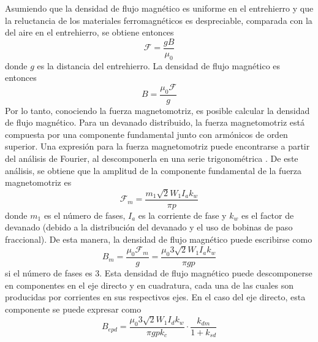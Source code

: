 Asumiendo que la densidad de flujo magnético es uniforme en el entrehierro y que la reluctancia de los materiales ferromagnéticos es despreciable, comparada con la del aire en el entrehierro, se obtiene entonces
\begin{equation*}
\mathscr{F} = \frac{gB}{\mu_0}
\end{equation*}
donde $g$ es la distancia del entrehierro. La densidad de flujo magnético es entonces
\begin{equation}
B = \frac{\mu_0\mathscr{F}}{g}
\end{equation}
Por lo tanto, conociendo la fuerza magnetomotriz, es posible calcular la densidad de flujo magnético. Para un devanado distribuido, la fuerza magnetomotriz está compuesta por una componente fundamental junto con armónicos de orden superior. Una expresión para la fuerza magnetomotriz puede encontrarse a partir del análisis de Fourier, al descomponerla en una serie trigonométrica \cite{boldea2010}. De este análisis, se obtiene que la amplitud de la componente fundamental de la fuerza magnetomotriz es
\begin{equation}
\mathscr{F}_m = \frac{m_1\sqrt{2}W_1 I_a k_w}{\pi p}
\end{equation}
donde $m_1$ es el número de fases, $I_a$ es la corriente de fase y $k_w$ es el factor de devanado (debido a la distribución del devanado y el uso de bobinas de paso fraccional). De esta manera, la densidad de flujo magnético puede escribirse como
\begin{equation}
B_m = \frac{\mu_0 \mathscr{F}_m}{g}
= \frac{\mu_0 3\sqrt{2}W_1 I_a k_w}{\pi g p}
\end{equation}
si el número de fases es 3. Esta densidad de flujo magnético puede descomponerse en componentes en el eje directo y en cuadratura, cada una de las cuales son producidas por corrientes en sus respectivos ejes. En el caso del eje directo, esta componente se puede expresar como
\begin{equation}
B_{epd} = \frac{\mu_0 3\sqrt{2}W_1 I_d k_w}{\pi g p k_c}\cdot
\frac{k_{dm}}{1+k_{sd}}
\end{equation}

